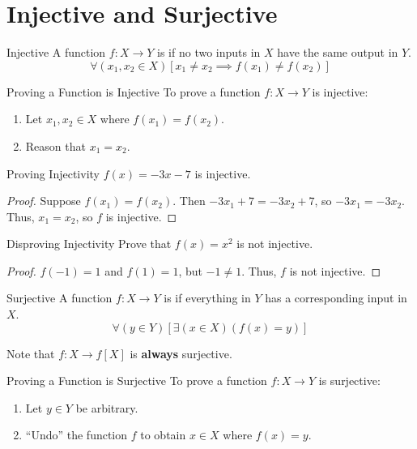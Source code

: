 \section{Injective and Surjective}

\begin{dfnbox}{Injective}{}
    A function $f : X \to Y$ is  if no two inputs in $X$ have the same output in $Y$.
    \tcblower
    \[ \forall (x_1, x_2 \in X) \left[ x_1 \neq x_2 \implies f\left(x_1\right) \neq f\left(x_2\right) \right] \]
\end{dfnbox}

\begin{tecbox}{Proving a Function is Injective}{}
    To prove a function $f : X \to Y$ is injective:
    \begin{enumerate}
        \item Let $x_1, x_2 \in X$ where $f(x_1) = f(x_2)$.
        \item Reason that $x_1 = x_2$.
    \end{enumerate}
\end{tecbox}

\begin{exbox}{Proving Injectivity}{}
    $f(x) = -3x-7$ is injective.
    \tcblower
    \begin{proof}
        Suppose $f(x_1) = f(x_2)$. Then $-3x_1+7 = -3x_2+7$, so $-3x_1 = -3x_2$. Thus, $x_1 = x_2$, so $f$ is injective.
    \end{proof}
\end{exbox}

\begin{exbox}{Disproving Injectivity}{}
    Prove that $f(x)=x^2$ is not injective.
    \tcblower
    \begin{proof}
        $f(-1) = 1$ and $f(1) = 1$, but $-1 \neq 1$. Thus, $f$ is not injective.
    \end{proof}
\end{exbox}

\begin{dfnbox}{Surjective}{}
    A function $f : X \to Y$ is  if everything in $Y$ has a corresponding input in $X$.
    \tcblower
    \[ \forall (y \in Y) \left[ \exists (x \in X) (f(x) = y) \right] \]
\end{dfnbox}

Note that $f : X \to f[X]$ is \textbf{always} surjective.

\begin{tecbox}{Proving a Function is Surjective}{}
    To prove a function $f : X \to Y$ is surjective:
    \begin{enumerate}
        \item Let $y \in Y$ be arbitrary.
        \item ``Undo'' the function $f$ to obtain $x \in X$ where $f(x)=y$.
    \end{enumerate}
\end{tecbox}

